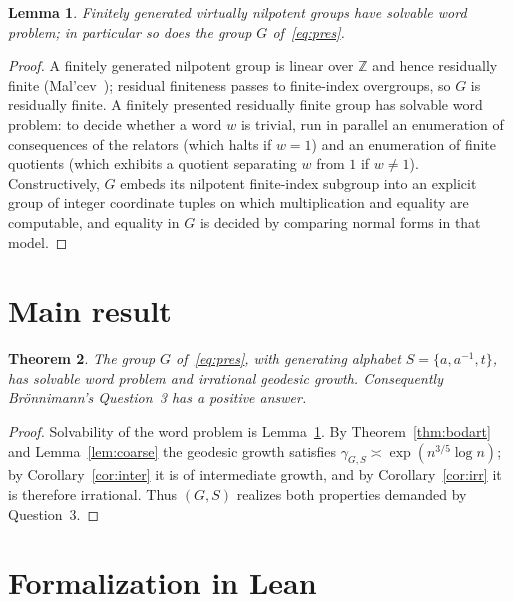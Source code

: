 \documentclass[reqno]{amsart}
\theoremstyle{plain}
\newtheorem{theorem}{Theorem}[section]
\newtheorem{lemma}[theorem]{Lemma}
\theoremstyle{definition}
\theoremstyle{remark}
\newcommand{\Z}{\mathbb{Z}}
\newcommand{\geod}{\gamma}
\begin{document}
\begin{lemma}
\label{lem:wp}
Finitely generated virtually nilpotent groups have solvable word problem; in particular so does
the group $G$ of~\eqref{eq:pres}.
\end{lemma}

\begin{proof}
A finitely generated nilpotent group is linear over $\Z$ and hence residually finite
(Mal'cev~\cite{Malcev}); residual finiteness passes to finite-index overgroups, so $G$ is
residually finite. A finitely presented residually finite group has solvable word problem: to
decide whether a word $w$ is trivial, run in parallel an enumeration of consequences of the
relators (which halts if $w=1$) and an enumeration of finite quotients (which exhibits a quotient
separating $w$ from $1$ if $w\ne1$). Constructively, $G$ embeds its nilpotent finite-index
subgroup into an explicit group of integer coordinate tuples on which multiplication and equality
are computable, and equality in $G$ is decided by comparing normal forms in that model.
\end{proof}

\section{Main result}

\begin{theorem}
\label{thm:main}
The group $G$ of~\eqref{eq:pres}, with generating alphabet $S=\{a,a^{-1},t\}$, has solvable word
problem and irrational geodesic growth. Consequently Br\"onnimann's Question~3 has a positive
answer.
\end{theorem}

\begin{proof}
Solvability of the word problem is Lemma~\ref{lem:wp}. By Theorem~\ref{thm:bodart} and
Lemma~\ref{lem:coarse} the geodesic growth satisfies $\geod_{G,S}\asymp\exp(n^{3/5}\log n)$; by
Corollary~\ref{cor:inter} it is of intermediate growth, and by Corollary~\ref{cor:irr} it is
therefore irrational. Thus $(G,S)$ realizes both properties demanded by Question~3.
\end{proof}

\section{Formalization in Lean}
\label{sec:lean}
\end{document}
